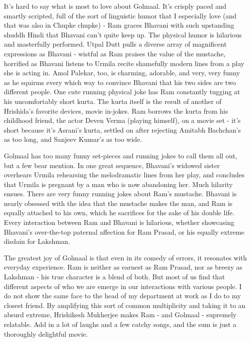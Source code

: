 \documentclass{article}
\begin{document}
It's hard to say what is most to love about Golmaal.  It's crisply paced and smartly scripted, full of the sort of linguistic humor that I especially love (and that was also in Chupke chupke) - Ram graces Bhavani with such upstanding shuddh Hindi that Bhavani can't quite keep up.  The physical humor is hilarious and masterfully performed.  Utpal Dutt pulls a diverse array of magnificent expressions as Bhavani - wistful as Ram praises the value of the mustache, horrified as Bhavani listens to Urmila recite shamefully modern lines from a play she is acting in.  Amol Palekar, too, is charming, adorable, and very, very funny as he squirms every which way to convince Bhavani that his two sides are two different people.  One cute running physical joke has Ram constantly tugging at his uncomfortably short kurta.  The kurta itself is the result of another of Hrishida's favorite devices, movie in-jokes.  Ram borrows the kurta from his childhood friend, the actor Deven Verma (playing himself), on a movie set - it's short because it's Asrani's kurta, settled on after rejecting Amitabh Bachchan's as too long, and Sanjeev Kumar's as too wide.

Golmaal has too many funny set-pieces and running jokes to call them all out, but a few bear mention.  In one great sequence, Bhavani's widowed sister overhears Urmila rehearsing the melodramatic lines from her play, and concludes that Urmila is pregnant by a man who is now abandoning her.  Much hilarity ensues.  There are very funny running jokes about Ram's mustache.  Bhavani is nearly obsessed with the idea that the mustache makes the man, and Ram is equally attached to his own, which he sacrifices for the sake of his double life.  Every interaction between Ram and Bhavani is hilarious, whether showcasing Bhavani's over-the-top paternal affection for Ram Prasad, or his equally extreme disdain for Lakshman\cite{goolmaall}. 

The greatest joy of Golmaal is that even in its comedy of errors, it resonates with everyday experience.  Ram is neither as earnest as Ram Prasad, nor as breezy as Lakshman - his true character is a blend of both.  But most of us find that different aspects of who we are emerge in our interactions with various people.  I do not show the same face to the head of my department at work as I do to my closest friend.  By amplifying this sort of common multiplicity and taking it to an absurd extreme, Hrishikesh Mukherjee makes Ram - and Golmaal - supremely relatable.  Add in a lot of laughs and a few catchy songs, and the sum is just a thoroughly delightful movie.
\end{document}
